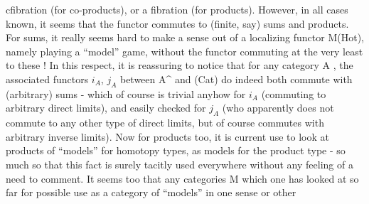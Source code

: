 cfibration (for co-products),  or a fibration (for products).  However,
in all cases known,  it seems that the functor commutes to (finite,  say)
sums and products.  For sums,  it really seems hard to make a sense out of
a localizing functor  M\hand{$\longrightarrow$}(Hot),  namely playing a ``model'' game,  without
the functor commuting at the very least to these !  In this respect,  it
is reassuring to notice that for any category A ,  the associated functors
$i_A$, $j_A$ between  A\^{} and (Cat) do indeed both commute with (arbitrary) sums
-  which of course is trivial anyhow for $i_A$ (commuting to arbitrary direct
limits),  and easily checked for $j_A$ (who apparently does not commute to any
other type of direct limits,  but of course commutes with arbitrary inverse
limits).  Now for products too,  it is current use to look at products of
``models'' for homotopy types,  as models for the product type  -  so much so
that this fact is surely tacitly used everywhere\hand{,} without any feeling of
a need to comment.  It seems too that any categories M which one has looked
at so far for possible use as a category of ``models'' in one sense or other

